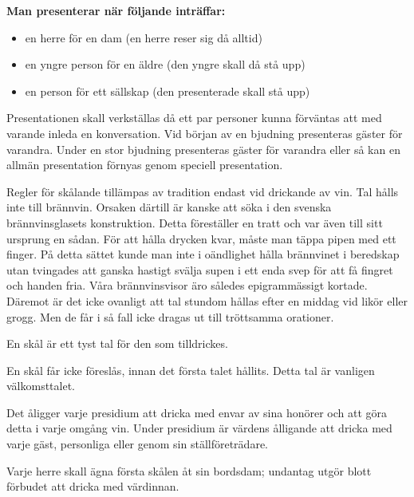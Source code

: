 \pagestyle{Hyfs och Etikett}


\textbf{Man presenterar när följande inträffar:}

\begin{itemize}
    \setlength{\itemindent}{0em}
    \item en herre för en dam (en herre reser sig då alltid)
    \item en yngre person för en äldre (den yngre skall då stå upp)
    \item en person för ett sällskap (den presenterade skall stå upp)
\end{itemize}

Presentationen skall verkställas då ett par personer kunna förväntas att med varande inleda en konversation. Vid början av en bjudning presenteras gäster för varandra. Under en stor bjudning presenteras gäster för varandra eller så kan en allmän presentation förnyas genom speciell presentation.


Regler för skålande tillämpas av tradition endast vid drickande av vin. Tal hålls inte till brännvin. Orsaken därtill är kanske att söka i den svenska brännvinsglasets konstruktion. Detta föreställer en tratt och var även till sitt ursprung en sådan. För att hålla drycken kvar, måste man täppa pipen med ett finger. På detta sättet kunde man inte i oändlighet hålla brännvinet i beredskap utan tvingades att ganska hastigt svälja supen i ett enda svep för att få fingret och handen fria. Våra brännvinsvisor äro således epigrammässigt kortade. Däremot är det icke ovanligt att tal stundom hållas efter en middag vid likör eller grogg. Men de får i så fall icke dragas ut till tröttsamma orationer.

En skål är ett tyst tal för den som tilldrickes.

En skål får icke föreslås, innan det första talet hållits. Detta tal är vanligen välkomsttalet.

Det åligger varje presidium att dricka med envar av sina honörer och att göra detta i varje omgång vin. Under presidium är värdens ålligande att dricka med varje gäst, personliga eller genom sin ställföreträdare.

Varje herre skall ägna första skålen åt sin bordsdam; undantag utgör blott förbudet att dricka med värdinnan.

